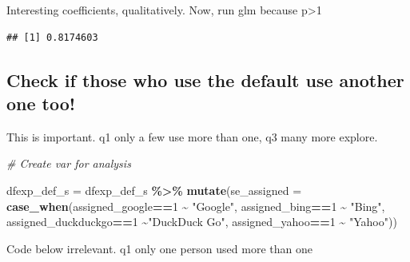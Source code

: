 \documentclass[
  11pt,
]{article}
\newenvironment{Shaded}{\begin{snugshade}}{\end{snugshade}}
\newcommand{\AttributeTok}[1]{\textcolor[rgb]{0.13,0.29,0.53}{#1}}
\newcommand{\CommentTok}[1]{\textcolor[rgb]{0.56,0.35,0.01}{\textit{#1}}}
\newcommand{\DecValTok}[1]{\textcolor[rgb]{0.00,0.00,0.81}{#1}}
\newcommand{\FunctionTok}[1]{\textcolor[rgb]{0.13,0.29,0.53}{\textbf{#1}}}
\newcommand{\NormalTok}[1]{#1}
\newcommand{\OtherTok}[1]{\textcolor[rgb]{0.56,0.35,0.01}{#1}}
\newcommand{\SpecialCharTok}[1]{\textcolor[rgb]{0.81,0.36,0.00}{\textbf{#1}}}
\newcommand{\StringTok}[1]{\textcolor[rgb]{0.31,0.60,0.02}{#1}}
\begin{document}
Interesting coefficients, qualitatively. Now, run glm because p\textgreater1

\begin{Shaded}
\end{Shaded}

\begin{verbatim}
## [1] 0.8174603
\end{verbatim}

\hypertarget{check-if-those-who-use-the-default-use-another-one-too}{%
\subsection{Check if those who use the default use another one too!}\label{check-if-those-who-use-the-default-use-another-one-too}}

This is important. q1 only a few use more than one, q3 many more explore.

\begin{Shaded}
\begin{Highlighting}[]
\CommentTok{\# Create var for analysis}

\NormalTok{dfexp\_def\_s }\OtherTok{=}\NormalTok{ dfexp\_def\_s }\SpecialCharTok{\%\textgreater{}\%} 
  \FunctionTok{mutate}\NormalTok{(}\AttributeTok{se\_assigned =} \FunctionTok{case\_when}\NormalTok{(assigned\_google}\SpecialCharTok{==}\DecValTok{1} \SpecialCharTok{\textasciitilde{}} \StringTok{"Google"}\NormalTok{,}
\NormalTok{                                 assigned\_bing}\SpecialCharTok{==}\DecValTok{1} \SpecialCharTok{\textasciitilde{}} \StringTok{"Bing"}\NormalTok{,}
\NormalTok{                                 assigned\_duckduckgo}\SpecialCharTok{==}\DecValTok{1} \SpecialCharTok{\textasciitilde{}}\StringTok{"DuckDuck Go"}\NormalTok{,}
\NormalTok{                                 assigned\_yahoo}\SpecialCharTok{==}\DecValTok{1} \SpecialCharTok{\textasciitilde{}} \StringTok{"Yahoo"}\NormalTok{))}
\end{Highlighting}
\end{Shaded}

Code below irrelevant. q1 only one person used more than one

\begin{Shaded}
\end{Shaded}
\end{document}
